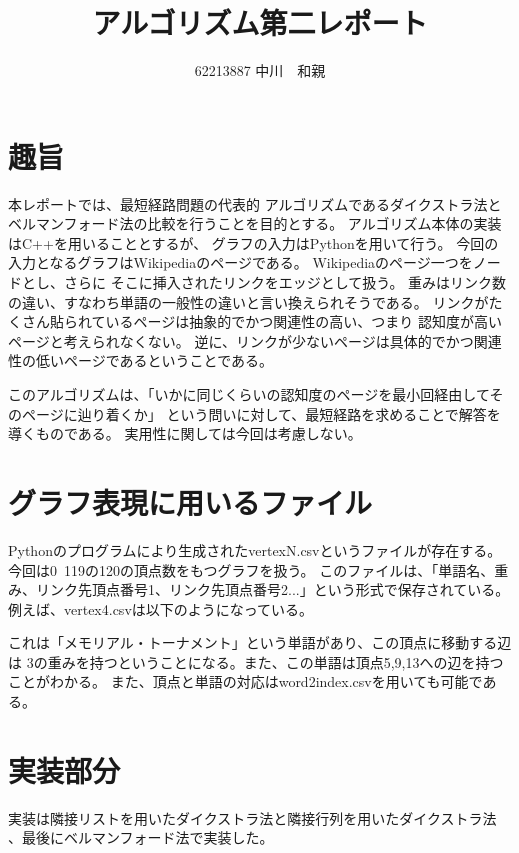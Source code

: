 \documentclass[12pt, a4paper, dvipdfmx]{jarticle}
\title{アルゴリズム第二レポート}
\author{62213887 中川　和親}
\begin{document}
\section{趣旨}
本レポートでは、最短経路問題の代表的
アルゴリズムであるダイクストラ法と
ベルマンフォード法の比較を行うことを目的とする。
アルゴリズム本体の実装はC++を用いることとするが、
グラフの入力はPythonを用いて行う。
今回の入力となるグラフはWikipediaのページである。
Wikipediaのページ一つをノードとし、さらに
そこに挿入されたリンクをエッジとして扱う。
重みはリンク数の違い、すなわち単語の一般性の違いと言い換えられそうである。
リンクがたくさん貼られているページは抽象的でかつ関連性の高い、つまり
認知度が高いページと考えられなくない。
逆に、リンクが少ないページは具体的でかつ関連性の低いページであるということである。

このアルゴリズムは、「いかに同じくらいの認知度のページを最小回経由してそのページに辿り着くか」
という問いに対して、最短経路を求めることで解答を導くものである。
実用性に関しては今回は考慮しない。

\section{グラフ表現に用いるファイル}
Pythonのプログラムにより生成されたvertexN.csvというファイルが存在する。
今回は0~119の120の頂点数をもつグラフを扱う。
このファイルは、「単語名、重み、リンク先頂点番号1、リンク先頂点番号2...」という形式で保存されている。
例えば、vertex4.csvは以下のようになっている。

これは「メモリアル・トーナメント」という単語があり、この頂点に移動する辺は
3の重みを持つということになる。また、この単語は頂点5,9,13への辺を持つことがわかる。
また、頂点と単語の対応はword2index.csvを用いても可能である。

\section{実装部分}
実装は隣接リストを用いたダイクストラ法と隣接行列を用いたダイクストラ法
、最後にベルマンフォード法で実装した。
\end{document}

